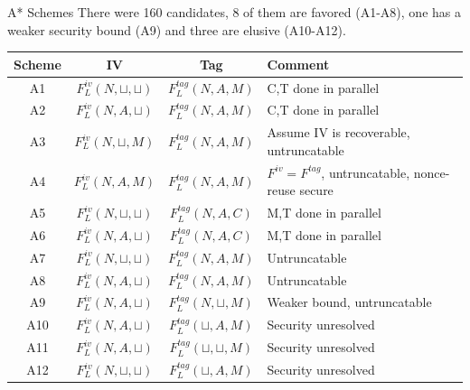 \documentclass[11pt]{beamer}
\begin{document}
\begin{frame}{A* Schemes}
There were 160 candidates, 8 of them are favored (A1-A8), one has a weaker security bound (A9) and three are elusive (A10-A12).

\begin{tiny}
\begin{center}
\begin{tabular}{ | c | c | c | l | }
        \hline
	Scheme & IV & Tag & Comment \\ \hline
	A1 & $F^{iv}_L(N,\sqcup,\sqcup)$ & $F^{tag}_L(N, A, M)$ & C,T done in parallel \\ \hline
	A2 & $F^{iv}_L(N,A,\sqcup)$ & $F^{tag}_L(N, A, M)$ & C,T done in parallel \\ \hline
	A3 & $F^{iv}_L(N,\sqcup,M)$ & $F^{tag}_L(N, A, M)$ & Assume IV is recoverable, untruncatable \\ \hline
	A4 & $F^{iv}_L(N,A,M)$ & $F^{tag}_L(N, A, M)$ & $F^{iv} = F^{tag}$, untruncatable, nonce-reuse secure \\ \hline
	A5 & $F^{iv}_L(N,\sqcup,\sqcup)$ & $F^{tag}_L(N, A, C)$ & M,T done in parallel \\ \hline
	A6 & $F^{iv}_L(N,A,\sqcup)$ & $F^{tag}_L(N, A, C)$ & M,T done in parallel \\ \hline
	A7 & $F^{iv}_L(N,\sqcup,\sqcup)$ & $F^{tag}_L(N, A, M)$ & Untruncatable \\ \hline
	A8 & $F^{iv}_L(N,A,\sqcup)$ & $F^{tag}_L(N, A, M)$ & Untruncatable \\ \hline
        \hline
	A9 & $F^{iv}_L(N,A,\sqcup)$ & $F^{tag}_L(N, \sqcup, M)$ & Weaker bound, untruncatable \\ \hline
        \hline
	A10 & $F^{iv}_L(N,A,\sqcup)$ & $F^{tag}_L(\sqcup, A, M)$ & Security unresolved \\ \hline
	A11 & $F^{iv}_L(N,A,\sqcup)$ & $F^{tag}_L(\sqcup,\sqcup, M)$ & Security unresolved \\ \hline
	A12 & $F^{iv}_L(N,\sqcup,\sqcup)$ & $F^{tag}_L(\sqcup, A, M)$ & Security unresolved \\ \hline
\end{tabular}
\end{center}
\end{tiny}
\end{frame}
\end{document}
